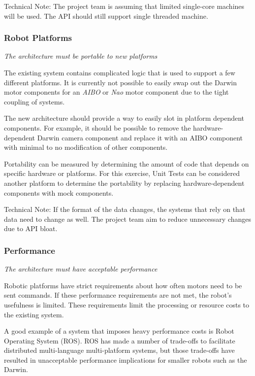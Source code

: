 \documentclass[english,12pt]{scrartcl}
\newcommand{\requirement}[1]{\textit{#1}}
\begin{document}
				Technical Note: The project team is assuming that limited single-core machines will be used.
				The API should still support single threaded machine.

			\subsubsection{Robot Platforms}
				\requirement{The architecture must be portable to new platforms}
	
				The existing system contains complicated logic that is used to support a few different platforms.
				It is currently not possible to easily swap out the Darwin motor components for an \emph{AIBO} or \emph{Nao} motor component due to the tight coupling of systems.
	
				The new architecture should provide a way to easily slot in platform dependent components.
				For example, it should be possible to remove the hardware-dependent Darwin camera component and replace it with an AIBO component with minimal to no modification of other components.
	
				Portability can be measured by determining the amount of code that depends on specific hardware or platforms.
				For this exercise, Unit Tests can be considered another platform to determine the portability by replacing hardware-dependent components with mock components.
	
				Technical Note: If the format of the data changes, the systems that rely on that data need to change as well.
				The project team aim to reduce unnecessary changes due to API bloat.

			\subsubsection{Performance}
				\requirement{The architecture must have acceptable performance}
	
				Robotic platforms have strict requirements about how often motors need to be sent commands.
				If these performance requirements are not met, the robot’s usefulness is limited.
				These requirements limit the processing or resource costs to the existing system. 
	
				A good example of a system that imposes heavy performance costs is Robot Operating System (ROS).
				ROS has made a number of trade-offs to facilitate distributed multi-language multi-platform systems, but those trade-offs have resulted in unacceptable performance implications for smaller robots such as the Darwin.
				
\end{document}
